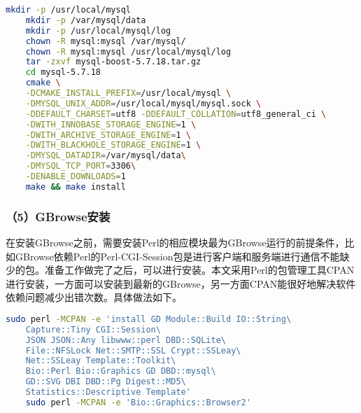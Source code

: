 	\begin{lstlisting}[language=bash]
	mkdir -p /usr/local/mysql
	mkdir -p /var/mysql/data
	mkdir -p /usr/local/mysql/log
	chown -R mysql:mysql /var/mysql/
	chown -R mysql:mysql /usr/local/mysql/log
	tar -zxvf mysql-boost-5.7.18.tar.gz
	cd mysql-5.7.18
	cmake \
	-DCMAKE_INSTALL_PREFIX=/usr/local/mysql \
	-DMYSQL_UNIX_ADDR=/usr/local/mysql/mysql.sock \
	-DDEFAULT_CHARSET=utf8 -DDEFAULT_COLLATION=utf8_general_ci \
	-DWITH_INNOBASE_STORAGE_ENGINE=1 \
	-DWITH_ARCHIVE_STORAGE_ENGINE=1 \
	-DWITH_BLACKHOLE_STORAGE_ENGINE=1 \
	-DMYSQL_DATADIR=/var/mysql/data\
	-DMYSQL_TCP_PORT=3306\
	-DENABLE_DOWNLOADS=1
	make && make install
	\end{lstlisting}
	\subsubsection{（5）GBrowse安装}
	在安装GBrowse之前，需要安装Perl的相应模块最为GBrowse运行的前提条件，比如GBrowse依赖Perl的Perl-CGI-Session包是进行客户端和服务端进行通信不能缺少的包。准备工作做完了之后，可以进行安装。本文采用Perl的包管理工具CPAN进行安装，一方面可以安装到最新的GBrowse，另一方面CPAN能很好地解决软件依赖问题减少出错次数。具体做法如下。
	\begin{lstlisting}[language=bash]
	sudo perl -MCPAN -e 'install GD Module::Build IO::String\
	Capture::Tiny CGI::Session\
	JSON JSON::Any libwww::perl DBD::SQLite\
	File::NFSLock Net::SMTP::SSL Crypt::SSLeay\
	Net::SSLeay Template::Toolkit\
	Bio::Perl Bio::Graphics GD DBD::mysql\
	GD::SVG DBI DBD::Pg Digest::MD5\
	Statistics::Descriptive Template'
	sudo perl -MCPAN -e 'Bio::Graphics::Browser2'
	\end{lstlisting}
